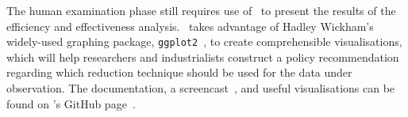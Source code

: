 
The human examination phase still requires use of \mr~to present the results of the efficiency and effectiveness analysis.
\mr~takes advantage of Hadley Wickham's widely-used graphing package, \texttt{ggplot2}~\cite{ggplot2}, to create comprehensible visualisations,
which will help researchers and industrialists construct a policy recommendation regarding which reduction technique should be used
for the data under observation. The documentation, a screencast~\cite{asciinema}, and useful visualisations can be found on \mr's
GitHub page~\cite{tool}.


